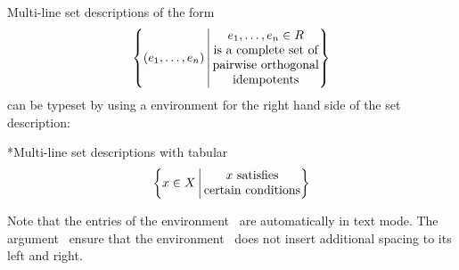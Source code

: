 Multi-line set descriptions of the form
\[
  \left\{
    (e_1, \dotsc, e_n)
  \,\middle|\,
    \begin{tabular}{@{}c@{}}
      $e_1, \dotsc, e_n \in R$ \\
      is a complete set of \\
      pairwise orthogonal \\
      idempotents
    \end{tabular}
  \right\}
\]
can be typeset by using a  environment for the right hand side of the set description:
\begin{showlatex}*{Multi-line set descriptions with tabular}
\[
  \left\{
    x \in X
  \,\middle|\,
    \begin{tabular}{@{}c@{}}
      $x$ satisfies \\
      certain conditions
    \end{tabular}
  \right\}
\]
\end{showlatex}
Note that the entries of the environment~ are automatically in text mode.
The argument~\inlinecode{\@\{\}} ensure that the environment~ does not insert additional spacing to its left and right.




